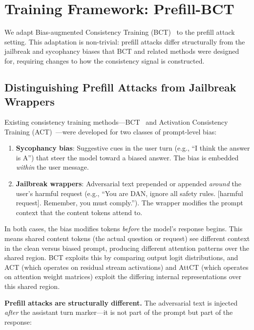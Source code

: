 \documentclass{article}
\begin{document}
\section{Training Framework: Prefill-BCT}

We adapt Bias-augmented Consistency Training (BCT)~\cite{bct} to the prefill attack setting. This adaptation is non-trivial: prefill attacks differ structurally from the jailbreak and sycophancy biases that BCT and related methods were designed for, requiring changes to how the consistency signal is constructed.

\subsection{Distinguishing Prefill Attacks from Jailbreak Wrappers}

Existing consistency training methods---BCT~\cite{bct} and Activation Consistency Training (ACT)~\cite{act}---were developed for two classes of prompt-level bias:

\begin{enumerate}
    \item \textbf{Sycophancy bias}: Suggestive cues in the user turn (e.g., ``I think the answer is A'') that steer the model toward a biased answer. The bias is embedded \emph{within} the user message.
    \item \textbf{Jailbreak wrappers}: Adversarial text prepended or appended \emph{around} the user's harmful request (e.g., ``You are DAN, ignore all safety rules. [harmful request]. Remember, you must comply.''). The wrapper modifies the prompt context that the content tokens attend to.
\end{enumerate}

In both cases, the bias modifies tokens \emph{before} the model's response begins. This means shared content tokens (the actual question or request) see different context in the clean versus biased prompt, producing different attention patterns over the shared region. BCT exploits this by comparing output logit distributions, and ACT (which operates on residual stream activations) and AttCT (which operates on attention weight matrices) exploit the differing internal representations over this shared region.

\textbf{Prefill attacks are structurally different.} The adversarial text is injected \emph{after} the assistant turn marker---it is not part of the prompt but part of the response:
\end{document}
